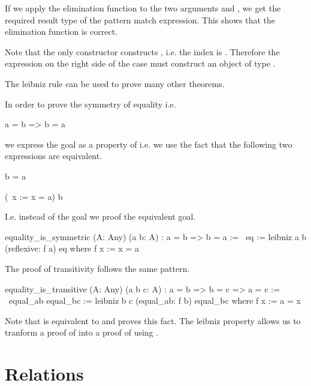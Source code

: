 If we apply the elimination function to the two arguments  and
, we get the required result type  of the pattern
match expression. This shows that the elimination function is correct.

Note that the only constructor  constructs , i.e.
the index is . Therefore the expression on the right side of the case
must construct an object of type .


The leibniz rule can be used to prove many other theorems.

In order to prove the symmetry of equality i.e.

\begin{alba}
    a = b  =>  b = a
\end{alba}

we express the goal  as a property of  i.e. we use the fact
that the following two expressions are equivalent.

\begin{alba}
    b = a

    (\ x := x = a) b
\end{alba}

I.e. instead of the goal  we proof the equivalent goal.


\begin{alba}
    equality_is_symmetric
        (A: Any)
        (a b: A)
        : a = b => b = a
    :=
        \ eq
        :=
            leibniz a b (reflexive: f a) eq
        where
            f x := x = a
\end{alba}

The proof of transitivity follows the same pattern.

\begin{alba}
    equality_is_transitive
        (A: Any) (a b c: A)
        : a = b => b = c => a = c
    :=
        \ equal_ab equal_bc
        :=
            leibniz b c (equal_ab: f b) equal_bc
        where
            f x := a = x
\end{alba}

Note that  is equivalent to  and  proves
this fact. The leibniz property allows us to tranform a proof of  into
a proof of  using .






\newpage


\section{Relations}
\label{sec:certprog-relations}


